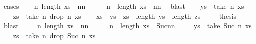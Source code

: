 \begin{isabellebody}
%
\isadelimproof
%
\endisadelimproof
%
\isatagproof
{}\isamarkupfalse%
\ cases\isanewline
\ \ \isamarkupfalse%
\ {\isachardoublequoteopen}{\isasymexists}n{\isachardot}{\kern0pt}\ length\ xs\ {\isacharequal}{\kern0pt}\ n{\isacharplus}{\kern0pt}n{\isachardoublequoteclose}\isanewline
\ \ \isamarkupfalse%
\ \isamarkupfalse%
\ n\ \ {\isachardoublequoteopen}length\ xs\ {\isacharequal}{\kern0pt}\ n{\isacharplus}{\kern0pt}n{\isachardoublequoteclose}\ \isamarkupfalse%
\ blast\isanewline
\ \ \isamarkupfalse%
\ {\isacharquery}{\kern0pt}ys\ {\isacharequal}{\kern0pt}\ {\isachardoublequoteopen}take\ n\ xs{\isachardoublequoteclose}\isanewline
\ \ \isamarkupfalse%
\ {\isacharquery}{\kern0pt}zs\ {\isacharequal}{\kern0pt}\ {\isachardoublequoteopen}take\ n\ {\isacharparenleft}{\kern0pt}drop\ n\ xs{\isacharparenright}{\kern0pt}{\isachardoublequoteclose}\isanewline
\ \ \isamarkupfalse%
\ {\isachardoublequoteopen}xs\ {\isacharequal}{\kern0pt}\ {\isacharquery}{\kern0pt}ys\ {\isacharat}{\kern0pt}\ {\isacharquery}{\kern0pt}zs\ {\isasymand}\ length\ {\isacharquery}{\kern0pt}ys\ {\isacharequal}{\kern0pt}\ length\ {\isacharquery}{\kern0pt}zs{\isachardoublequoteclose}\ \isamarkupfalse%
\isanewline
\ \ \isamarkupfalse%
\ {\isacharquery}{\kern0pt}thesis\ \isamarkupfalse%
\ blast\isanewline
{}\isamarkupfalse%
\isanewline
\ \ \isamarkupfalse%
\ {\isachardoublequoteopen}{\isasymnot}\ {\isacharparenleft}{\kern0pt}{\isasymexists}n{\isachardot}{\kern0pt}\ length\ xs\ {\isacharequal}{\kern0pt}\ n{\isacharplus}{\kern0pt}n{\isacharparenright}{\kern0pt}{\isachardoublequoteclose}\isanewline
\ \ \isamarkupfalse%
\ \isamarkupfalse%
\ n\ \ {\isachardoublequoteopen}length\ xs\ {\isacharequal}{\kern0pt}\ Suc{\isacharparenleft}{\kern0pt}n{\isacharplus}{\kern0pt}n{\isacharparenright}{\kern0pt}{\isachardoublequoteclose}\ \isamarkupfalse%
\isanewline
\ \ \isamarkupfalse%
\ {\isacharquery}{\kern0pt}ys\ {\isacharequal}{\kern0pt}\ {\isachardoublequoteopen}take\ {\isacharparenleft}{\kern0pt}Suc\ n{\isacharparenright}{\kern0pt}\ xs{\isachardoublequoteclose}\isanewline
\ \ \isamarkupfalse%
\ {\isacharquery}{\kern0pt}zs\ {\isacharequal}{\kern0pt}\ {\isachardoublequoteopen}take\ n\ {\isacharparenleft}{\kern0pt}drop\ {\isacharparenleft}{\kern0pt}Suc\ n{\isacharparenright}{\kern0pt}\ xs{\isacharparenright}{\kern0pt}{\isachardoublequoteclose}\isanewline

\end{isabellebody}
